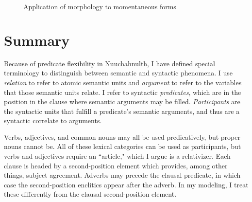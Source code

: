 \begin{figure}[H]
\begin{center}
\caption{Application of morphology to momentaneous forms}
\label{figure:momentaneousapplication}
\end{center}
\end{figure}

\section{Summary} \label{ch:clause:summary}

Because of predicate flexibility in Nuuchahnulth, I have defined special terminology to distinguish between semantic and syntactic phenomena. I use \textit{relation} to refer to atomic semantic units and \textit{argument} to refer to the variables that those semantic units relate. I refer to syntactic \textit{predicates}, which are in the position in the clause where semantic arguments may be filled. \textit{Participants} are the syntactic units that fulfill a predicate's semantic arguments, and thus are a syntactic correlate to arguments.

Verbs, adjectives, and common nouns may all be used predicatively, but proper nouns cannot be. All of these lexical categories can be used as participants, but verbs and adjectives require an ``article," which I argue is a relativizer. Each clause is headed by a second-position element which provides, among other things, subject agreement. Adverbs may precede the clausal predicate, in which case the second-position enclitics appear after the adverb. In my modeling, I treat these differently from the clausal second-position element.

